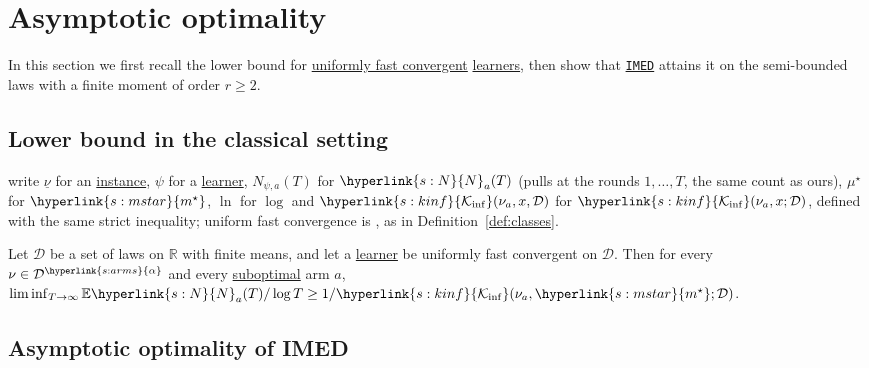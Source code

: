 \documentclass[11pt]{article}
\newcommand{\E}{\mathbb{E}}
\newcommand{\R}{\mathbb{R}}
\newcommand{\sy}[2]{{\hyperlink{#1}{#2}}}
\newcommand{\term}[2]{\hyperlink{#1}{#2}}
\newcommand{\imed}{\hyperref[alg:imed]{\texttt{IMED}}}
\newcommand{\arms}{\sy{s:arms}{\alpha}}
\newcommand{\ms}{\sy{s:mstar}{m^{\star}}}
\newcommand{\Kinf}{\sy{s:kinf}{\mathcal{K}_{\inf}}}
\newcommand{\Np}{\sy{s:N}{N}}
\begin{document}
\section{Asymptotic optimality}\label{sec:optimal}

In this section we first recall the lower bound for \term{w:ufc}{uniformly fast convergent} \term{w:learner}{learners}, then show
that \imed{} attains it on the semi-bounded laws with a finite moment of order $r\ge2$.

\subsection{Lower bound in the classical setting}

\citet{GMS19} write $\underline\nu$ for an \term{w:instance}{instance}, $\psi$ for a \term{w:learner}{learner}, $N_{\psi,a}(T)$ for
$\Np_a(T)$ (pulls at the rounds $1,\dots,T$, the same count as ours), $\mu^\star$ for $\ms$, $\ln$ for
$\log$ and $\Kinf(\nu_a,x,\mathcal D)$ for $\Kinf(\nu_a,x;\mathcal D)$, defined with the same strict
inequality; uniform fast convergence is \citet[Definition~1]{GMS19}, as in
Definition~\ref{def:classes}.

\begin{theorem}\label{cite:GMS19-thm1}
Let $\mathcal D$ be a set of laws on $\R$ with finite means, and let a \term{w:learner}{learner} be uniformly fast
convergent on $\mathcal D$. Then for every $\nu\in\mathcal D^\arms$ and every \term{w:subopt}{suboptimal} arm $a$,
$\liminf_{T\to\infty}\E \Np_a(T)/\log T\ge1/\Kinf(\nu_a,\ms;\mathcal D)$.
\end{theorem}

\subsection{Asymptotic optimality of IMED}
\end{document}

